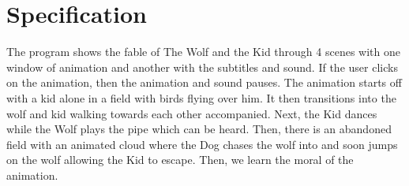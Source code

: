 \documentclass{article}
\begin{document}
\tableofcontents

\newpage\section{Specification}
The program shows the fable of The Wolf and the
Kid through 4 scenes with one window of animation and another with the subtitles and sound.
If the user clicks on the animation, then the animation and sound pauses.
The animation starts off with a kid alone in a field with birds flying over him.
It then transitions into the wolf and kid walking towards each other accompanied.
Next, the Kid dances while the Wolf plays the pipe which can be heard.
Then, there is an abandoned field with an animated cloud where the Dog chases the wolf
into and soon jumps on the wolf allowing the Kid to escape.
Then, we learn the moral of the animation.
\end{document}
